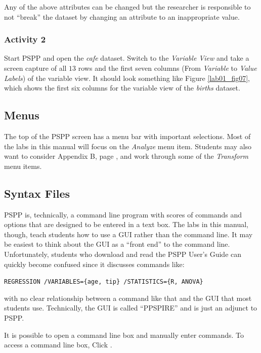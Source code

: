 Any of the above attributes can be changed but the researcher is responsible to not ``break'' the dataset by changing an attribute to an inappropriate value.

\subsubsection{Activity 2} \label{lab01_act02}

Start \acs{PSPP} and open the \textit{cafe} dataset. Switch to the \textit{Variable View} and take a screen capture of all $ 13 $ rows and the first seven columns (From \textit{Variable} to \textit{Value Labels}) of the variable view. It should look something like Figure \ref{lab01_fig07}, which shows the first six columns for the variable view of the \textit{births} dataset.

\subsection{Menus}

The top of the \acs{PSPP} screen has a menu bar with important selections. Most of the labs in this manual will focus on the \textit{Analyze} menu item. Students may also want to consider Appendix B, page \pageref{app:b}, and work through some of the \textit{Transform} menu items.

\subsection{Syntax Files}

\acs{PSPP} is, technically, a command line program with scores of commands and options that are designed to be entered in a text box. The labs in this manual, though, teach students how to use a \ac{GUI} rather than the command line. It may be easiest to think about the \ac{GUI} as a ``front end'' to the command line. Unfortunately, students who download and read the \acs{PSPP} User's Guide can quickly become confused since it discusses commands like: 

\lstinline[columns=fixed]|REGRESSION /VARIABLES={age, tip} /STATISTICS={R, ANOVA}|

with no clear relationship between a command like that and the \ac{GUI} that most students use. Technically, the \ac{GUI} is called ``PPSPIRE'' and is just an adjunct to \acs{PSPP}.

It is possible to open a command line box and manually enter commands. To access a command line box, Click \textsc{}. 

